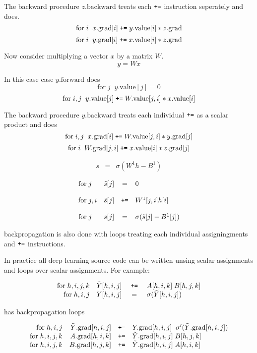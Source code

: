 {\vfill
The backward procedure $z.\mathrm{backward}$ treats each $\mbox{\tt +=}$ instruction seperately and does.
$$\mathrm{for}\;i\;\;x.\mathrm{grad}[i] \;\mbox{\tt +=}\;y.\mathrm{value}[i]*z.\mathrm{grad}$$
$$\mathrm{for}\;i\;\;y.\mathrm{grad}[i] \;\mbox{\tt +=}\;x.\mathrm{value}[i]*z.\mathrm{grad}$$

Now consider multiplying a vector $x$ by a matrix $W$.
$$y = Wx$$

\vfill
In this case case $y.\mathrm{forward}$ does
$$\mathrm{for}\;j\;\;y.\mathrm{value}[j] = 0$$
$$\mathrm{for}\;i,j\;\;y.\mathrm{value}[j] \;\mbox{\tt +=}\;W.\mathrm{value}[j,i]*x.\mathrm{value}[i]$$

\vfill
The backward procedure $y.\mathrm{backward}$ treats each individual $\mbox{\tt +=}$ as a scalar product and does
$$\mathrm{for}\;i,j\;\;x.\mathrm{grad}[i] \;\mbox{\tt +=}\;W.\mathrm{value}[j,i]*y.\mathrm{grad}[j]$$
$$\mathrm{for}\;i\;\;W.\mathrm{grad}[j,i] \;\mbox{\tt +=}\;x.\mathrm{value}[i]*z.\mathrm{grad}[j]$$


\begin{eqnarray*}
   s & = & \sigma\left(W^1h - B^1 \right)
\end{eqnarray*}

\vfill
$$\begin{array}{lrcl}
\mathrm{for}\;j &  \tilde{s}[j] & = & 0 \\
\\
\mathrm{for}\;j,i &  \tilde{s}[j] & \mbox{\tt +=} &  W^1[j,i]h[i] \\
\\
\mathrm{for}\; j & s[j] & = & \sigma(\tilde{s}[j] - B^1[j])
\end{array}$$

\vfill
backpropagation is also done with loops treating each individual assigningments and $\mbox{\tt +=}$ instructions.


In practice all deep learning source code can be written unsing scalar assignments and loops over scalar assignments.
For example:

$$\begin{array}{rrcl}
\mathrm{for}\; h,i,j,k & \tilde{Y}[h,i,j] & \;\mbox{\tt +=}\; & A[h,i,k]\;B[h,j,k] \\
\mathrm{for}\; h,i,j & Y[h,i,j] & = & \sigma(\tilde{Y}[h,i,j])
\end{array}$$

\vfill
has backpropagation loops

$$\begin{array}{rrcl}
\mathrm{for}\;h,i,j & \tilde{Y}.\mathrm{grad}[h,i,j] & \mbox{\tt +=} & Y.\mathrm{grad}[h,i,j]\;\;\sigma'(\tilde{Y}.\mathrm{grad}[h,i,j]) \\
\mathrm{for}\;h,i,j,k & A.\mathrm{grad}[h,i,k] & \mbox{\tt +=} & \tilde{Y}.\mathrm{grad}[h,i,j] \;B[h,j,k] \\
\mathrm{for}\;h,i,j,k & B.\mathrm{grad}[h,j,k] & \mbox{\tt +=} & \tilde{Y}.\mathrm{grad}[h,i,j]\;A[h,i,k]
\end{array}$$

}



